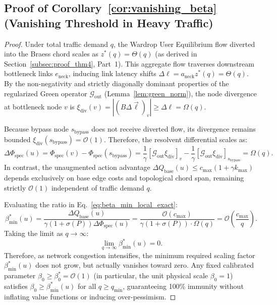 \documentclass[11pt,a4paper]{article}
\begin{document}
\subsection{Proof of Corollary~\ref{cor:vanishing_beta} (Vanishing Threshold in Heavy Traffic)}
\label{subsec:proof_cor1}

\begin{proof}
Under total traffic demand $q$, the Wardrop User Equilibrium flow diverted into the Braess chord scales as $z^*(q) = \Theta(q)$ (as derived in Section~\ref{subsec:proof_thm4}, Part~1). 
This aggregate flow traverses downstream bottleneck links $e_{\text{neck}}$, inducing link latency shifts $\Delta \ell = a_{\text{neck}} z^*(q) = \Theta(q)$. By the non-negativity and strictly diagonally dominant properties of the regularized Green operator $\mathcal{G}_{\text{out}}$ (Lemma~\ref{lem:green_norm}), the node divergence at bottleneck node $v$ is $\xi_{\text{div}}(v) = |(B \Delta \vec{\ell})_v| \ge \Delta \ell = \Omega(q)$. 

Because bypass node $s_{\text{bypass}}$ does not receive diverted flow, its divergence remains bounded $\xi_{\text{div}}(s_{\text{bypass}}) = \mathcal{O}(1)$. Therefore, the resolvent differential scales as:
\begin{equation}
\Delta \Phi_{\text{spec}}(u) = \Phi_{\text{spec}}(v) - \Phi_{\text{spec}}(s_{\text{bypass}}) = \frac{1}{\gamma} [\mathcal{G}_{\text{out}} \xi_{\text{div}}]_v - \frac{1}{\gamma} [\mathcal{G}_{\text{out}} \xi_{\text{div}}]_{s_{\text{bypass}}} = \Omega(q).
\end{equation}
In contrast, the unaugmented action advantage $\Delta Q_{\text{base}}(u) \le c_{\max}(1 + \gamma k_{\max})$ depends exclusively on base edge costs and topological chord span, remaining strictly $\mathcal{O}(1)$ independent of traffic demand $q$.

Evaluating the ratio in Eq.~\eqref{eq:beta_min_local_exact}:
\begin{equation}
\beta_{\min}^*(u) = \frac{\Delta Q_{\text{base}}(u)}{\gamma (1 + \sigma(P)) \Delta \Phi_{\text{spec}}(u)} = \frac{\mathcal{O}(c_{\max})}{\gamma (1 + \sigma(P)) \cdot \Omega(q)} = \mathcal{O}\left( \frac{c_{\max}}{q} \right).
\end{equation}
Taking the limit as $q \to \infty$:
\begin{equation}
\lim_{q \to \infty} \beta_{\min}^*(u) = 0.
\end{equation}
Therefore, as network congestion intensifies, the minimum required scaling factor $\beta_{\min}^*(u)$ does not grow, but actually vanishes toward zero. Any fixed calibrated parameter $\beta_0 \ge \beta_0^* = \mathcal{O}(1)$ (in particular, the unit physical scale $\beta_0 = 1$) satisfies $\beta_0 \ge \beta_{\min}^*(u)$ for all $q \ge q_{\min}$, guaranteeing 100\% immunity without inflating value functions or inducing over-pessimism.
\end{proof}
\end{document}
